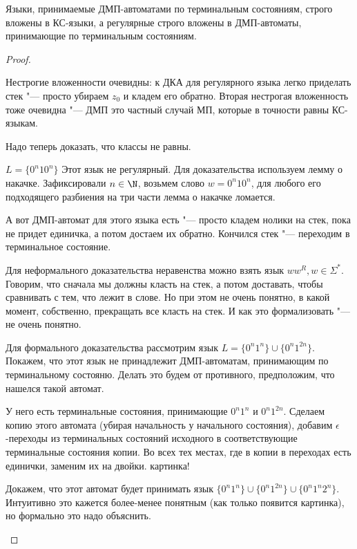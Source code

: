 \begin{theorem}
Языки, принимаемые ДМП-автоматами по терминальным состояниям, строго вложены в КС-языки, а регулярные строго вложены в ДМП-автоматы, принимающие по терминальным состояниям.
\end{theorem}
\begin{proof}
    \begin{description}
Нестрогие вложенности очевидны: к ДКА для регулярного языка легко приделать стек "--- просто убираем $z_0$ и кладем его обратно.
Вторая нестрогая вложенность тоже очевидна "--- ДМП это частный случай МП, которые в точности равны КС-языкам.

Надо теперь доказать, что классы не равны.

\item[Регулярные $\neq$ ДМП-автоматам]

$L = \{0^n10^n\}$
Этот язык не регулярный. Для доказательства используем лемму о накачке. Зафиксировали $n \in \N$, возьмем слово $w = 0^n10^n$, для любого его подходящего разбиения на три части лемма о накачке ломается.

А вот ДМП-автомат для этого языка есть "--- просто кладем нолики на стек, пока не придет единичка, а потом достаем их обратно. 
Кончился стек "--- переходим в терминальное состояние.

\item[ДМП-автоматы $neq$ КС-языки]
Для неформального доказательства неравенства можно взять язык $ww^R, w \in \Sigma^*$.
Говорим, что сначала мы должны класть на стек, а потом доставать, чтобы сравнивать с тем, что лежит в слове.
Но при этом не очень понятно, в какой момент, собственно, прекращать все класть на стек.
И как это формализовать "--- не очень понятно.

Для формального доказательства рассмотрим язык $L = \{0^n1^n\} \cup \{0^n 1^{2n}\}$.
Покажем, что этот язык не принадлежит ДМП-автоматам, принимающим по терминальному состояню.
Делать это будем от противного, предположим, что нашелся такой автомат.

У него есть терминальные состояния, принимающие $0^n1^n$ и $0^n1^{2n}$.
Сделаем копию этого автомата (убирая начальность у начального состояния), добавим $\epsilon$-переходы из терминальных состояний исходного в соответствующие терминальные состояния копии.
Во всех тех местах, где в копии в переходах есть единички, заменим их на двойки.
\TODO картинка!

Докажем, что этот автомат будет принимать язык $\{0^n1^n\} \cup \{0^n1^{2n}\} \cup \{0^n1^n2^n\}$.
Интуитивно это кажется более-менее понятным (как только появится картинка), но формально это надо объяснить.


\end{description}
\end{proof}
